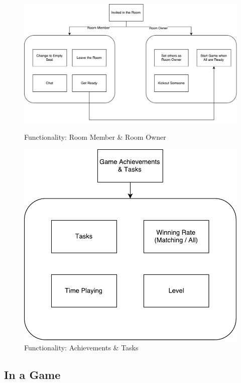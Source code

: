 \documentclass[11pt]{article}
\begin{document}
\begin{figure}
\centering
\begin{minipage}{.6\linewidth}
\centering
\includegraphics[width=.9\linewidth]{func-inroom.pdf}
\caption{Functionality: Room Member \& Room Owner}
\label{fig:func-inroom}
\end{minipage}%
\begin{minipage}{.4\linewidth}
\centering
\includegraphics[width=.9\linewidth]{func-tasks.pdf}
\caption{Functionality: Achievements \& Tasks}
\label{fig:func-tasks}
\end{minipage}
\end{figure}

\subsection{In a Game}
\end{document}
